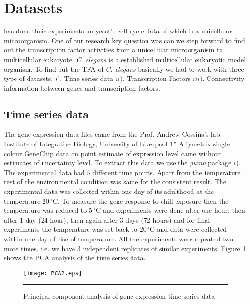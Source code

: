 \section{Datasets}
\cite{Sanguinetti:2006} has done their experiments on yeast's cell cycle data of \cite{Spellman:1998} which is a 
unicellular microorganism. One of our research key question was can we step forward to find out the transcription 
factor activities from a unicellular microorganism to multicellular eukaryote. \textit{C. elegans} is a established 
multicellular eukaryotic model organism. To find out the TFA of \textit{C. elegans} basically we had to work with three 
type of datasets. $i).$ Time series data $ii).$ Transcription Factors 
$iii).$ Connectivity information between genes and transcription factors.

\subsection{Time series data}
The gene expression data files came from the Prof. Andrew Cossins's lab, Institute of Integrative Biology, University 
of Liverpool %
15 Affymetrix single colour GeneChip data on point estimate of expression level came without
estimates of uncertainty level. To extract this data we use the \textit{puma} package (\cite{puma}).
The experimental data had 5 different time points. Apart from the temperature rest of the environmental condition
was same for the consistent result. The experimental data was collected within one day of its
adulthood at the temperature $20\,^{\circ}\mathrm{C}$. To measure the gene response to chill exposure then the
temperature was reduced to $5\,^{\circ}\mathrm{C}$ and experiments were done after one hour, then after 1 day (24 hour), 
then again after 3 days (72 hours) and for final experiments the temperature was set back to $20\,^{\circ}\mathrm{C}$
and data were collected within one day  of rise of temperature. All the experiments were repeated two more times.
i.e. we have 3 independent replicates of similar experiments. Figure \ref{fig:PCA_time_series} shows the PCA 
analysis of the time series data.


\begin{figure}
	\centering
		\texttt{[image: PCA2.eps]}
		\rule{35em}{0.5pt}
	\caption[Principal component analysis of time series data ]
		{Principal component analysis of gene expression time series data}
	\label{fig:PCA_time_series}
\end{figure}

